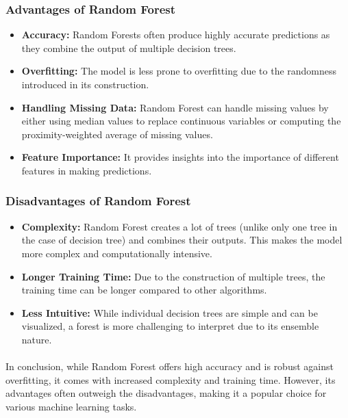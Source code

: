         \subsubsection{Advantages of Random Forest}

        \begin{itemize}
            \item \textbf{Accuracy:} Random Forests often produce highly accurate predictions as they combine the output of multiple decision trees.
            
            \item \textbf{Overfitting:} The model is less prone to overfitting due to the randomness introduced in its construction.
            
            \item \textbf{Handling Missing Data:} Random Forest can handle missing values by either using median values to replace continuous variables or computing the proximity-weighted average of missing values.
            
            \item \textbf{Feature Importance:} It provides insights into the importance of different features in making predictions.
        \end{itemize}

        \subsubsection{Disadvantages of Random Forest}

        \begin{itemize}
            \item \textbf{Complexity:} Random Forest creates a lot of trees (unlike only one tree in the case of decision tree) and combines their outputs. This makes the model more complex and computationally intensive.
            
            \item \textbf{Longer Training Time:} Due to the construction of multiple trees, the training time can be longer compared to other algorithms.
            
            \item \textbf{Less Intuitive:} While individual decision trees are simple and can be visualized, a forest is more challenging to interpret due to its ensemble nature.
        \end{itemize}

        \paragraph{}In conclusion, while Random Forest offers high accuracy and is robust against overfitting, it comes with increased complexity and training time. However, its advantages often outweigh the disadvantages, making it a popular choice for various machine learning tasks.


